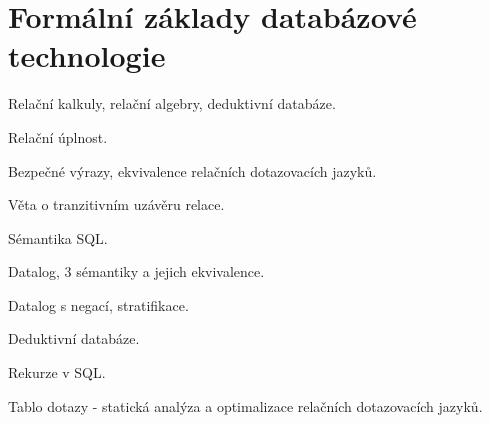 \newpage
\section{Formální základy databázové technologie}
\begin{pozadavky}
\begin{pitemize}
\item Relační kalkuly, relační algebry, deduktivní databáze.
\item Relační úplnost.
\item Bezpečné výrazy, ekvivalence relačních dotazovacích jazyků.
\item Věta o tranzitivním uzávěru relace.
\item Sémantika SQL.
\item Datalog, 3 sémantiky a jejich ekvivalence.
\item Datalog s negací, stratifikace.
\item Deduktivní databáze.
\item Rekurze v SQL.
\item Tablo dotazy - statická analýza a optimalizace relačních dotazovacích jazyků.
\end{pitemize}
\end{pozadavky}